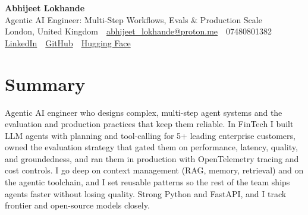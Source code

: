 \documentclass[10pt,a4paper]{article}
\newcommand{\sep}{\,\textcolor{accent!60}{\textbar}\,}
\begin{document}
\begin{center}
  {\fontsize{24}{26}\selectfont\bfseries Abhijeet Lokhande}\\[3pt]
  {\color{accent}\large Agentic AI Engineer: Multi-Step Workflows, Evals \& Production Scale}\\[5pt]
  {\small
    London, United Kingdom \sep
    \href{mailto:abhijeet_lokhande@proton.me}{abhijeet\_lokhande@proton.me} \sep
    07480801382 \\[2pt]
    \href{https://www.linkedin.com/in/ablds/}{LinkedIn} \sep
    \href{https://github.com/abhijeetscode}{GitHub} \sep
    \href{https://huggingface.co/ab-ai}{Hugging Face}
  }
\end{center}
\vspace{2pt}

\section{Summary}
Agentic AI engineer who designs complex, multi-step agent systems and the evaluation and production practices that keep them reliable. In FinTech I built LLM agents with planning and tool-calling for 5+ leading enterprise customers, owned the evaluation strategy that gated them on performance, latency, quality, and groundedness, and ran them in production with OpenTelemetry tracing and cost controls. I go deep on context management (RAG, memory, retrieval) and on the agentic toolchain, and I set reusable patterns so the rest of the team ships agents faster without losing quality. Strong Python and FastAPI, and I track frontier and open-source models closely.

\end{document}
